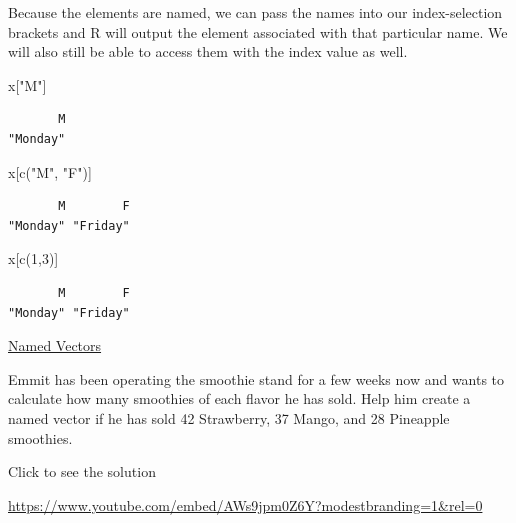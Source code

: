 \documentclass[
  letterpaper,
  DIV=11,
  numbers=noendperiod]{scrreprt}
\newenvironment{Shaded}{\begin{snugshade}}{\end{snugshade}}
\newcommand{\DecValTok}[1]{\textcolor[rgb]{0.68,0.00,0.00}{#1}}
\newcommand{\FunctionTok}[1]{\textcolor[rgb]{0.28,0.35,0.67}{#1}}
\newcommand{\NormalTok}[1]{\textcolor[rgb]{0.00,0.23,0.31}{#1}}
\newcommand{\StringTok}[1]{\textcolor[rgb]{0.13,0.47,0.30}{#1}}
\begin{document}
Because the elements are named, we can pass the names into our
index-selection brackets and R will output the element associated with
that particular name. We will also still be able to access them with the
index value as well.

\begin{Shaded}
\begin{Highlighting}[]
\NormalTok{x[}\StringTok{"M"}\NormalTok{]}
\end{Highlighting}
\end{Shaded}

\begin{verbatim}
       M 
"Monday" 
\end{verbatim}

\begin{Shaded}
\begin{Highlighting}[]
\NormalTok{x[}\FunctionTok{c}\NormalTok{(}\StringTok{"M"}\NormalTok{, }\StringTok{"F"}\NormalTok{)]}
\end{Highlighting}
\end{Shaded}

\begin{verbatim}
       M        F 
"Monday" "Friday" 
\end{verbatim}

\begin{Shaded}
\begin{Highlighting}[]
\NormalTok{x[}\FunctionTok{c}\NormalTok{(}\DecValTok{1}\NormalTok{,}\DecValTok{3}\NormalTok{)]}
\end{Highlighting}
\end{Shaded}

\begin{verbatim}
       M        F 
"Monday" "Friday" 
\end{verbatim}

\begin{watch}{}{}
    \href{https://youtu.be/uYHuPb60zSA}{Named Vectors}
\end{watch}

\begin{tcolorbox}[enhanced jigsaw, colframe=quarto-callout-tip-color-frame, colback=white, breakable, rightrule=.15mm, title=\textcolor{quarto-callout-tip-color}{\faLightbulb}\hspace{0.5em}{Try it Out}, bottomtitle=1mm, toptitle=1mm, titlerule=0mm, left=2mm, coltitle=black, colbacktitle=quarto-callout-tip-color!10!white, leftrule=.75mm, opacitybacktitle=0.6, bottomrule=.15mm, opacityback=0, arc=.35mm, toprule=.15mm]

Emmit has been operating the smoothie stand for a few weeks now and
wants to calculate how many smoothies of each flavor he has sold. Help
him create a named vector if he has sold 42 Strawberry, 37 Mango, and 28
Pineapple smoothies.

Click to see the solution

\url{https://www.youtube.com/embed/AWs9jpm0Z6Y?modestbranding=1&rel=0}

\end{tcolorbox}
\end{document}
